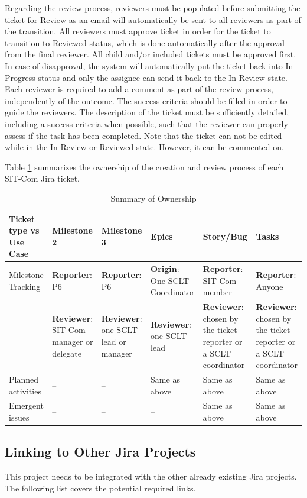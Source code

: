\documentclass[SE,authoryear,toc]{lsstdoc}
\begin{document}
Regarding the review process, reviewers must be populated before submitting the ticket for Review as an email will automatically be sent to all reviewers as part of the transition. 
All reviewers must approve ticket in order for the ticket to transition to Reviewed status, which is done automatically after the approval from the final reviewer. 
All child and/or included tickets must be approved first. 
In case of disapproval, the system will automatically put the ticket back into In Progress status and only the assignee can send it back to the In Review state. 
Each reviewer is required to add a comment as part of the review process, independently of the outcome. 
The success criteria should be filled in order to guide the reviewers.
The description of the ticket must be sufficiently detailed, including a success criteria when possible, such that the reviewer can properly assess if the task has been completed.
Note that the ticket can not be edited while in the In Review or Reviewed state. 
However, it can be commented on. 


Table \ref{tab:owner} summarizes the ownership of the creation and review process of each SIT-Com Jira ticket. 
\begin{table}
\begin{center}
\caption{\label{tab:owner} Summary of Ownership}
\begin{tabular}{|p{1.8cm}|p{1.8cm}|p{1.8cm}|p{1.8cm}|p{1.8cm}|p{1.8cm}}
\hline
Ticket type vs Use Case              & Milestone 2	& Milestone 3& Epics	& Story/Bug	& Tasks \\
\hline
\hline
Milestone Tracking & {\bf Reporter}: P6 &{\bf Reporter}: P6& {\bf Origin}: One SCLT Coordinator & {\bf Reporter}: SIT-Com member & {\bf Reporter}: Anyone \\
 & {\bf Reviewer}: SIT-Com manager or delegate & {\bf Reviewer}: one SCLT lead or manager & {\bf Reviewer}: one SCLT lead & {\bf Reviewer}: chosen by the ticket reporter or a SCLT coordinator & {\bf Reviewer}: chosen by the ticket reporter or a SCLT coordinator \\
\hline
Planned activities & -- & -- & Same as above & Same as above & Same as above \\
\hline
Emergent issues & -- & -- & -- & Same as above & Same as above \\
\hline
\end{tabular}
\end{center}
\end{table}

\subsection{Linking to Other Jira Projects}
\label{sec:other_jiras}
This project needs to be integrated with the other already existing Jira projects. 
The following list covers the potential required links.
\end{document}
